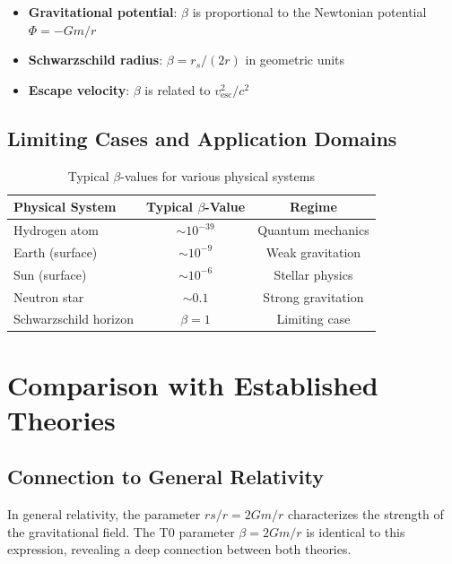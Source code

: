 	\begin{itemize}
		\item \textbf{Gravitational potential}: $\beta$ is proportional to the Newtonian potential $\Phi = -Gm/r$
		\item \textbf{Schwarzschild radius}: $\beta = r_s/(2r)$ in geometric units
		\item \textbf{Escape velocity}: $\beta$ is related to $v_{\text{esc}}^2/c^2$
	\end{itemize}
	
	\subsection{Limiting Cases and Application Domains}
	\label{subsec:limiting_cases}
	
	\begin{table}[htbp]
		\centering
		\begin{tabular}{lcc}
			\toprule
			\textbf{Physical System} & \textbf{Typical $\beta$-Value} & \textbf{Regime} \\
			\midrule
			Hydrogen atom & $\sim 10^{-39}$ & Quantum mechanics \\
			Earth (surface) & $\sim 10^{-9}$ & Weak gravitation \\
			Sun (surface) & $\sim 10^{-6}$ & Stellar physics \\
			Neutron star & $\sim 0.1$ & Strong gravitation \\
			Schwarzschild horizon & $\beta = 1$ & Limiting case \\
			\bottomrule
		\end{tabular}
		\caption{Typical $\beta$-values for various physical systems}
		\label{tab:beta_values}
	\end{table}
	
	\section{Comparison with Established Theories}
	\label{sec:theory_comparison}
	
	\subsection{Connection to General Relativity}
	\label{subsec:gr_connection}
	
	In general relativity, the parameter $rs/r = 2Gm/r$ characterizes the strength of the gravitational field. The T0 parameter $\beta = 2Gm/r$ is identical to this expression, revealing a deep connection between both theories.
	
